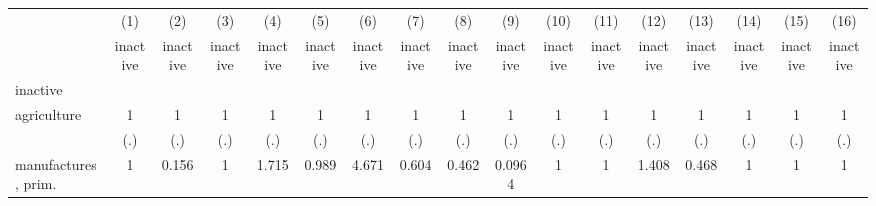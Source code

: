 {
\def\sym#1{\ifmmode^{#1}\else\(^{#1}\)\fi}
\begin{tabular}{l*{16}{c}}
\hline\hline
                    &\multicolumn{1}{c}{(1)}&\multicolumn{1}{c}{(2)}&\multicolumn{1}{c}{(3)}&\multicolumn{1}{c}{(4)}&\multicolumn{1}{c}{(5)}&\multicolumn{1}{c}{(6)}&\multicolumn{1}{c}{(7)}&\multicolumn{1}{c}{(8)}&\multicolumn{1}{c}{(9)}&\multicolumn{1}{c}{(10)}&\multicolumn{1}{c}{(11)}&\multicolumn{1}{c}{(12)}&\multicolumn{1}{c}{(13)}&\multicolumn{1}{c}{(14)}&\multicolumn{1}{c}{(15)}&\multicolumn{1}{c}{(16)}\\
                    &\multicolumn{1}{c}{inactive}&\multicolumn{1}{c}{inactive}&\multicolumn{1}{c}{inactive}&\multicolumn{1}{c}{inactive}&\multicolumn{1}{c}{inactive}&\multicolumn{1}{c}{inactive}&\multicolumn{1}{c}{inactive}&\multicolumn{1}{c}{inactive}&\multicolumn{1}{c}{inactive}&\multicolumn{1}{c}{inactive}&\multicolumn{1}{c}{inactive}&\multicolumn{1}{c}{inactive}&\multicolumn{1}{c}{inactive}&\multicolumn{1}{c}{inactive}&\multicolumn{1}{c}{inactive}&\multicolumn{1}{c}{inactive}\\
\hline
inactive            &                     &                     &                     &                     &                     &                     &                     &                     &                     &                     &                     &                     &                     &                     &                     &                     \\
agriculture         &           1         &           1         &           1         &           1         &           1         &           1         &           1         &           1         &           1         &           1         &           1         &           1         &           1         &           1         &           1         &           1         \\
                    &         (.)         &         (.)         &         (.)         &         (.)         &         (.)         &         (.)         &         (.)         &         (.)         &         (.)         &         (.)         &         (.)         &         (.)         &         (.)         &         (.)         &         (.)         &         (.)         \\
[1em]
manufactures, prim. &           1         &       0.156         &           1         &       1.715         &       0.989         &       4.671         &       0.604         &       0.462         &      0.0964         &           1         &           1         &       1.408         &       0.468         &           1         &           1         &           1         \\

\end{tabular}}

